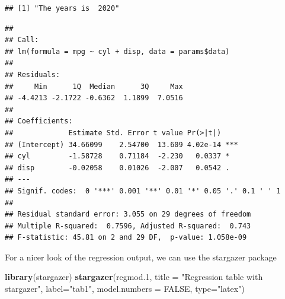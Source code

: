 \documentclass[
]{article}
\newenvironment{Shaded}{\begin{snugshade}}{\end{snugshade}}
\newcommand{\AttributeTok}[1]{\textcolor[rgb]{0.13,0.29,0.53}{#1}}
\newcommand{\ConstantTok}[1]{\textcolor[rgb]{0.56,0.35,0.01}{#1}}
\newcommand{\FloatTok}[1]{\textcolor[rgb]{0.00,0.00,0.81}{#1}}
\newcommand{\FunctionTok}[1]{\textcolor[rgb]{0.13,0.29,0.53}{\textbf{#1}}}
\newcommand{\NormalTok}[1]{#1}
\newcommand{\OtherTok}[1]{\textcolor[rgb]{0.56,0.35,0.01}{#1}}
\newcommand{\SpecialCharTok}[1]{\textcolor[rgb]{0.81,0.36,0.00}{\textbf{#1}}}
\newcommand{\StringTok}[1]{\textcolor[rgb]{0.31,0.60,0.02}{#1}}
\begin{document}
\begin{Shaded}
\end{Shaded}

\begin{verbatim}
## [1] "The years is  2020"
\end{verbatim}

\begin{Shaded}
\end{Shaded}

\begin{verbatim}
## 
## Call:
## lm(formula = mpg ~ cyl + disp, data = params$data)
## 
## Residuals:
##     Min      1Q  Median      3Q     Max 
## -4.4213 -2.1722 -0.6362  1.1899  7.0516 
## 
## Coefficients:
##             Estimate Std. Error t value Pr(>|t|)    
## (Intercept) 34.66099    2.54700  13.609 4.02e-14 ***
## cyl         -1.58728    0.71184  -2.230   0.0337 *  
## disp        -0.02058    0.01026  -2.007   0.0542 .  
## ---
## Signif. codes:  0 '***' 0.001 '**' 0.01 '*' 0.05 '.' 0.1 ' ' 1
## 
## Residual standard error: 3.055 on 29 degrees of freedom
## Multiple R-squared:  0.7596, Adjusted R-squared:  0.743 
## F-statistic: 45.81 on 2 and 29 DF,  p-value: 1.058e-09
\end{verbatim}

For a nicer look of the regression output, we can use the stargazer
package

\begin{Shaded}
\begin{Highlighting}[]
\FunctionTok{library}\NormalTok{(stargazer)}
\FunctionTok{stargazer}\NormalTok{(regmod}\FloatTok{.1}\NormalTok{,}
          \AttributeTok{title =} \StringTok{"Regression table with stargazer"}\NormalTok{,}
          \AttributeTok{label=}\StringTok{"tab1"}\NormalTok{, }
          \AttributeTok{model.numbers =} \ConstantTok{FALSE}\NormalTok{,}
          \AttributeTok{type=}\StringTok{"latex"}\NormalTok{)}
\end{Highlighting}
\end{Shaded}
\end{document}
